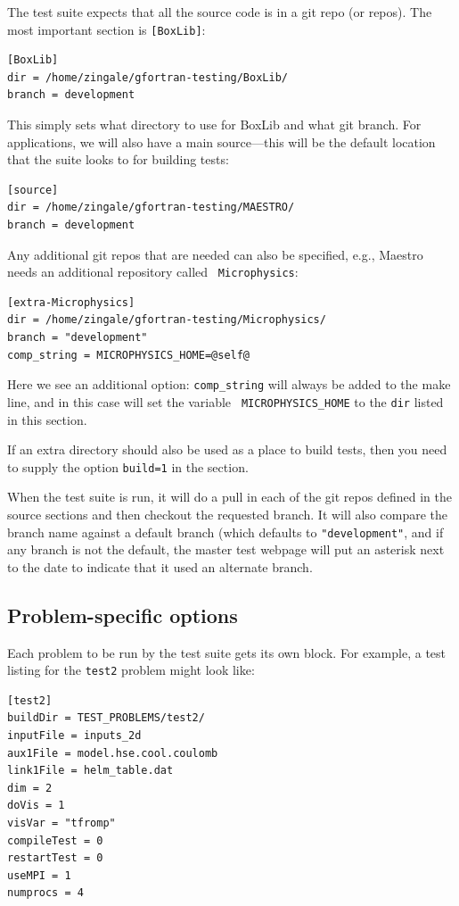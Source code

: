 The test suite expects that all the source code is in a git repo (or
repos).  The most important section is {\tt [BoxLib]}:
\begin{lstlisting}
[BoxLib]
dir = /home/zingale/gfortran-testing/BoxLib/
branch = development
\end{lstlisting}
This simply sets what directory to use for BoxLib and what git branch.
For applications, we will also have a main source---this will be the
default location that the suite looks to for building tests:
\begin{lstlisting}
[source]
dir = /home/zingale/gfortran-testing/MAESTRO/
branch = development
\end{lstlisting}
Any additional git repos that are needed can also be specified, e.g.,
{\sf Maestro} needs an additional repository called {\tt
  Microphysics}:
\begin{lstlisting}
[extra-Microphysics]
dir = /home/zingale/gfortran-testing/Microphysics/
branch = "development"
comp_string = MICROPHYSICS_HOME=@self@
\end{lstlisting}
Here we see an additional option: {\tt comp\_string} will always be
added to the make line, and in this case will set the variable {\tt
  MICROPHYSICS\_HOME} to the {\tt dir} listed in this section.

If an extra directory should also be used as a place to build tests,
then you need to supply the option {\tt build=1} in the section.

When the test suite is run, it will do a pull in each of the git repos
defined in the source sections and then checkout the requested branch.
It will also compare the branch name against a default branch (which
defaults to {\tt "development"}, and if any branch is not the default,
the master test webpage will put an asterisk next to the date to
indicate that it used an alternate branch.

\subsection{Problem-specific options}

Each problem to be run by the test suite gets its own block.  For
example, a test listing for the {\tt test2} problem might look like:

\begin{lstlisting}
[test2]
buildDir = TEST_PROBLEMS/test2/
inputFile = inputs_2d
aux1File = model.hse.cool.coulomb
link1File = helm_table.dat
dim = 2
doVis = 1
visVar = "tfromp"
compileTest = 0
restartTest = 0
useMPI = 1
numprocs = 4
\end{lstlisting}


